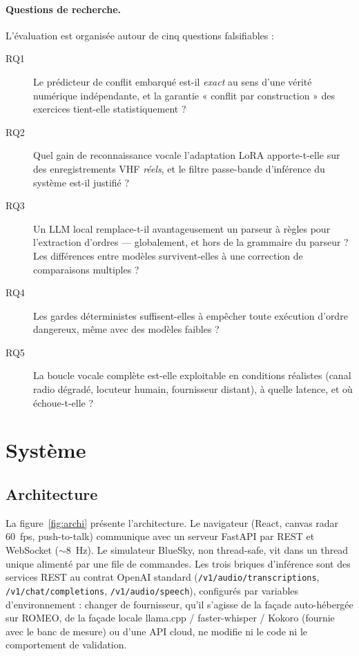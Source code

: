 \documentclass[10pt,a4paper]{article}
\newcommand{\syst}[1]{\texttt{#1}}
\begin{document}
\paragraph{Questions de recherche.} L'évaluation est organisée autour de
cinq questions falsifiables :
\begin{description}
  \item[RQ1] Le prédicteur de conflit embarqué est-il \emph{exact} au sens
    d'une vérité numérique indépendante, et la garantie « conflit par
    construction » des exercices tient-elle statistiquement ?
  \item[RQ2] Quel gain de reconnaissance vocale l'adaptation LoRA
    apporte-t-elle sur des enregistrements VHF \emph{réels}, et le filtre
    passe-bande d'inférence du système est-il justifié ?
  \item[RQ3] Un LLM local remplace-t-il avantageusement un parseur à règles
    pour l'extraction d'ordres --- globalement, et hors de la grammaire du
    parseur ? Les différences entre modèles survivent-elles à une correction
    de comparaisons multiples ?
  \item[RQ4] Les gardes déterministes suffisent-elles à empêcher toute
    exécution d'ordre dangereux, même avec des modèles faibles ?
  \item[RQ5] La boucle vocale complète est-elle exploitable en conditions
    réalistes (canal radio dégradé, locuteur humain, fournisseur distant),
    à quelle latence, et où échoue-t-elle ?
\end{description}

\section{Système}
\label{sec:systeme}

\subsection{Architecture}

La figure~\ref{fig:archi} présente l'architecture. Le navigateur (React,
canvas radar 60~fps, push-to-talk) communique avec un serveur FastAPI par REST
et WebSocket ($\sim$8~Hz). Le simulateur BlueSky, non thread-safe, vit dans un
thread unique alimenté par une file de commandes. Les trois briques
d'inférence sont des services REST au contrat OpenAI standard
(\syst{/v1/audio/transcriptions}, \syst{/v1/chat/completions},
\syst{/v1/audio/speech}), configurés par variables d'environnement : changer de fournisseur, qu'il s'agisse de la façade auto-hébergée sur ROMEO, de la façade locale llama.cpp / faster-whisper / Kokoro (fournie avec le banc de mesure) ou d'une API cloud, ne modifie ni le code ni le comportement de validation.
\end{document}
